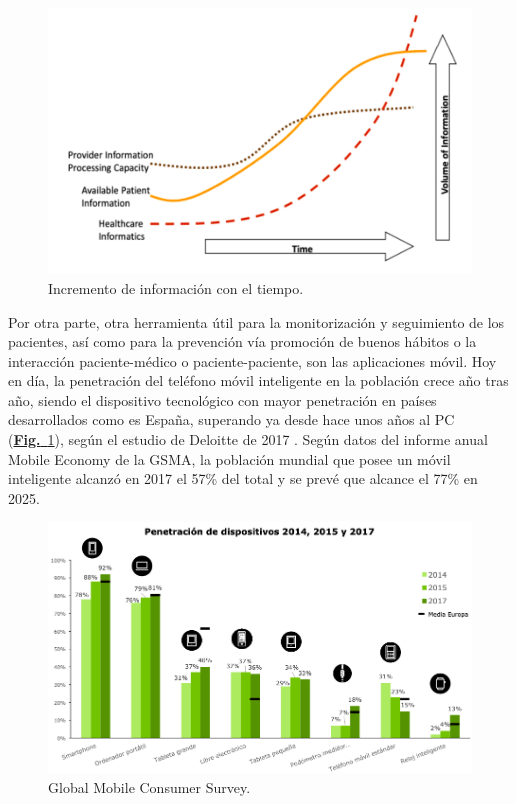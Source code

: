 \documentclass{article}
\begin{document}
\begin{figure}[h]
\centering
\includegraphics[width = 0.8\linewidth]{../images/cap2.png}
\caption{Incremento de información con el tiempo.}
\end{figure}

Por otra parte, otra herramienta útil para la monitorización y
seguimiento de los pacientes, así como para la prevención vía
promoción de buenos hábitos o la interacción paciente-médico o
paciente-paciente, son las aplicaciones móvil. Hoy en día, la
penetración del teléfono móvil inteligente en la población crece año
tras año, siendo el dispositivo tecnológico con mayor penetración en
países desarrollados como es España, superando ya desde hace unos años
al PC (\hyperref[fig:cap]{\textbf{Fig.}~\ref*{fig:cap}}), según el estudio de Deloitte de 2017
\cite{deloitte2017}. Según datos del informe anual Mobile Economy de
la GSMA, la población mundial que posee un móvil inteligente alcanzó
en 2017 el 57\% del total y se prevé que alcance el 77\% en 2025.

\begin{figure}[h]
\centering
\includegraphics[width = 0.8\linewidth]{../images/cap1.png}
\caption{Global Mobile Consumer Survey.}
\label{fig:cap}
\end{figure}
\end{document}
